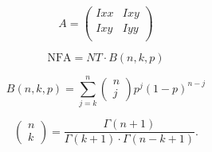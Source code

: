 \documentclass{article}
\begin{document}
\[ A = \left(\begin{array}{cc} Ixx & Ixy \\ Ixy & Iyy \\ \end{array}\right) \]
\pagebreak

\[ \mathrm{NFA} = NT \cdot B(n,k,p) \]
\pagebreak

\[ B(n,k,p) = \sum_{j=k}^n \left(\begin{array}{c}n\\j\end{array}\right) p^{j} (1-p)^{n-j} \]
\pagebreak

\[ \left(\begin{array}{c}n\\k\end{array}\right) = \frac{ \Gamma(n+1) }{ \Gamma(k+1) \cdot \Gamma(n-k+1) }. \]
\pagebreak
\end{document}
